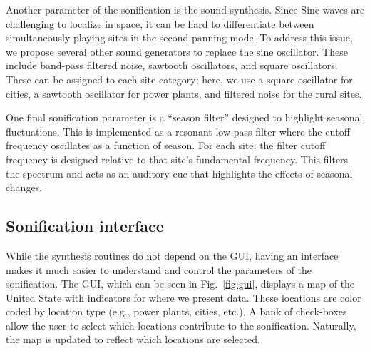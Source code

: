 \documentclass[a4paper,10pt,oneside]{article}
\newcommand{\ce}[1]{$\mathrm{#1}$}
\begin{document}
\begin{sloppy}
Another parameter of the sonification is the sound synthesis. Since Sine waves are challenging to localize in space, it can be hard to differentiate between simultaneously playing sites in the second panning mode. To address this issue, we propose several other sound generators to replace the sine oscillator. These include band-pass filtered noise, sawtooth oscillators, and square oscillators. These can be assigned to each site category; here, we use a square oscillator for cities, a sawtooth oscillator for power plants, and filtered noise for the rural sites. 

One final sonification parameter is a ``season filter'' designed to highlight seasonal fluctuations. This is implemented as a resonant low-pass filter where the cutoff frequency oscillates as a function of season. For each site, the filter cutoff frequency is designed relative to that site's fundamental frequency.  This filters the spectrum and acts as an auditory cue that highlights the effects of seasonal changes. 






\subsection{Sonification interface}

While the synthesis routines do not depend on the GUI, having an interface makes it much easier to understand and control the parameters of the sonification. The GUI, which can be seen in Fig.~\ref{fig:gui}, displays a map of the United State with indicators for where we present data.  These locations are color coded by location type (e.g., power plants, cities, etc.). A bank of check-boxes allow the user to select which locations contribute to the sonification. Naturally, the map is updated to reflect which locations are selected.  



\end{sloppy}
\end{document}
